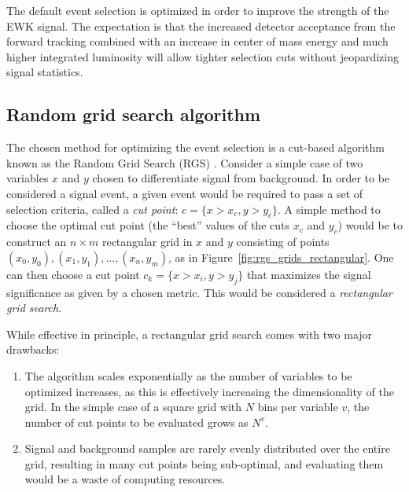 The default event selection is optimized in order to improve the strength of the \ssww EWK signal.
The expectation is that the increased detector acceptance from the forward tracking combined with an increase in center of mass energy and much higher integrated luminosity will allow tighter selection cuts without jeopardizing signal statistics.

%
\subsection{Random grid search algorithm}\label{sswwupgrade:opt_rgs}
The chosen method for optimizing the event selection is a cut-based algorithm known as the Random Grid Search (RGS) \cite{2018.rgs-paper}.
Consider a simple case of two variables $x$ and $y$ chosen to differentiate signal from background.
In order to be considered a signal event, a given event would be required to pass a set of selection criteria, called a \emph{cut point}: $c = \{x > x_c, y > y_c\}$.
A simple method to choose the optimal cut point (the ``best'' values of the cuts $x_c$ and $y_c$) would be to construct an $n\times m$ rectangular grid in $x$ and $y$ consisting of points $(x_0,y_0), (x_1,y_1), ..., (x_n,y_m)$, as in Figure~\ref{fig:rgs_grids_rectangular}.
One can then choose a cut point $c_k = \{x > x_i, y > y_j\}$ that maximizes the signal significance as given by a chosen metric.
This would be considered a \emph{rectangular grid search}.

While effective in principle, a rectangular grid search comes with two major drawbacks:
\begin{enumerate}
\item The algorithm scales exponentially as the number of variables to be optimized increases, as this is effectively increasing the dimensionality of the grid.  In the simple case of a square grid with $N$ bins per variable $v$, the number of cut points to be evaluated grows as $N^v$.
\item Signal and background samples are rarely evenly distributed over the entire grid, resulting in many cut points being sub-optimal, and evaluating them would be a waste of computing resources.
\end{enumerate}

